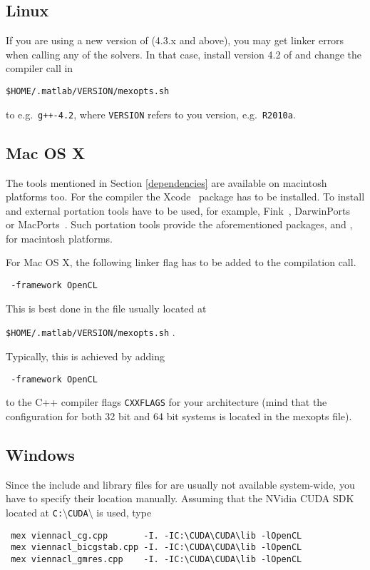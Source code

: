 
\subsection{Linux}
If you are using a new version of \GCC (4.3.x and above), you may get linker errors when calling any of the solvers. In that case, install version 4.2 of {\GCC} and change the compiler call in 
\begin{center}\texttt{\${HOME}/.matlab/{{\MATLAB}VERSION}/mexopts.sh} \end{center}
to e.g.~\texttt{g++-4.2}, where \texttt{{\MATLAB}VERSION} refers to you {\MATLAB} version, e.g.~\texttt{R2010a}.


\subsection{Mac OS X}
\label{apple}
The tools mentioned in Section \ref{dependencies} are available on 
macintosh platforms too. 
For the {\GCC} compiler the Xcode~\cite{xcode} package has to be installed.
To install {\CMake} and {\Boost} external portation tools have to be used, 
for example, Fink~\cite{fink}, DarwinPorts~\cite{darwinports} 
or MacPorts~\cite{macports}. Such portation tools provide the 
aforementioned packages, {\CMake} and {\Boost}, for macintosh platforms. 

For Mac OS X, the following linker flag has to be added to the compilation call.
\begin{lstlisting}
 -framework OpenCL
\end{lstlisting}
This is best done in the  file usually located at
\begin{center}\texttt{\${HOME}/.matlab/{{\MATLAB}VERSION}/mexopts.sh} . \end{center}
Typically, this is achieved by adding
\begin{lstlisting}
 -framework OpenCL
\end{lstlisting}
to the C++ compiler flags \texttt{CXXFLAGS} for your architecture (mind that the configuration for both 32 bit and 64 bit systems is located in the mexopts file).

\subsection{Windows}
Since the include and library files for {\OpenCL} are usually not available system-wide, you have to specify their location manually. Assuming that the NVidia CUDA SDK located at \texttt{C:$\setminus$CUDA$\setminus$} is used, type
\begin{lstlisting}
 mex viennacl_cg.cpp       -I. -IC:\CUDA\CUDA\lib -lOpenCL
 mex viennacl_bicgstab.cpp -I. -IC:\CUDA\CUDA\lib -lOpenCL
 mex viennacl_gmres.cpp    -I. -IC:\CUDA\CUDA\lib -lOpenCL
\end{lstlisting}


